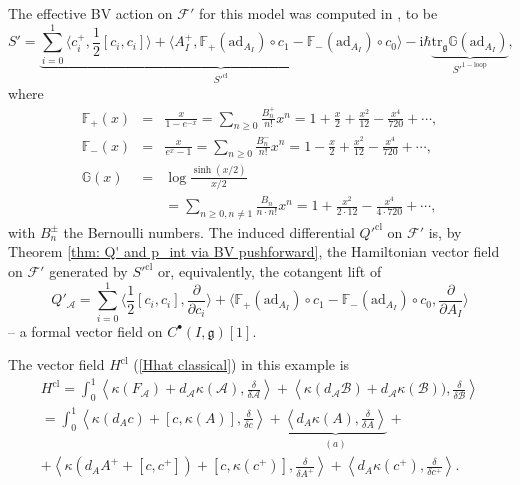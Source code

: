 \documentclass{amsart}
\theoremstyle{plain} %
\theoremstyle{definition}
\theoremstyle{remark}
\newcommand{\g}{\mathfrak{g}}
\newcommand{\mr}{\mathrm}
\newcommand{\bt}{\bullet}
\newcommand{\ad}{\mathrm{ad}}
\newcommand{\F}{\mathcal{F}}
\newcommand{\dd}{\partial}
\newcommand{\iii}{\mathrm{i}}
\newcommand{\cl}{\mathrm{cl}}
\newcommand{\A}{\mathcal{A}}
\newcommand{\B}{\mathcal{B}}
\begin{document}
The effective BV action on $\F'$ for this model was computed in \cite{simpBF}, \cite{discrBF} to be 
\begin{equation}
    S'=\underbrace{\sum_{i=0}^1\langle c^+_i,\frac12[c_i,c_i] \rangle
    +
    \langle A^+_I, \mathbb{F}_+(\ad_{A_I})\circ c_1 - \mathbb{F}_-(\ad_{A_I})\circ c_0 \rangle}_{S'^\cl} - \iii\hbar \underbrace{\mr{tr}_\g \mathbb{G}(\ad_{A_I})}_{S'^{\mr{1-loop}}},
\end{equation}
where
\begin{eqnarray}
    \mathbb{F}_+(x) &=&\frac{x}{1-e^{-x}}=\sum_{n\geq 0}\frac{B_n^+}{n!}x^n =1+\frac{x}{2}+\frac{x^2}{12}-\frac{x^4}{720}+\cdots,\\ 
    \mathbb{F}_-(x)&=&\frac{x}{e^x-1}=\sum_{n\geq 0}\frac{B_n^-}{n!}x^n=1-\frac{x}{2}+\frac{x^2}{12}-\frac{x^4}{720}+\cdots,\\ 
    \mathbb{G}(x)&=&\log \frac{\sinh (x/2)}{x/2} \label{G(x)}\\
    \nonumber &&=\sum_{n\geq 0,n\neq 1}\frac{B_n}{n\cdot n!}x^n=1+\frac{x^2}{2\cdot 12}-\frac{x^4}{4\cdot 720}+\cdots,
\end{eqnarray}
with $B_n^\pm$ the Bernoulli numbers. The induced differential $Q'^\cl$ on $\F'$ is, by Theorem \ref{thm: Q' and p_int via BV pushforward}, the Hamiltonian vector field on $\F'$ generated by $S'^\cl$ or, equivalently, the cotangent lift of 
\begin{equation}
Q'_\A= \sum_{i=0}^1\langle \frac12 [c_i,c_i],\frac{\dd}{\dd c_i} \rangle+
\langle \mathbb{F}_+(\ad_{A_I})\circ c_1-\mathbb{F}_-(\ad_{A_I})\circ c_0 , \frac{\dd}{\dd A_I}\rangle
\end{equation}
-- a formal vector field on $C^\bt(I,\g)[1]$.






The vector field $H^\cl$ (\ref{Hhat classical}) in this example is
\begin{multline}\label{1d BF Hhat classical}
    H^\cl= 
    \int_0^1 \left\langle \kappa (F_\A) +d_\A \kappa(\A),\frac{\delta}{\delta\A} \right\rangle + \left\langle \kappa(d_\A \B)+d_\A \kappa(\B)),\frac{\delta}{\delta \B} \right\rangle\\
    =
    \int_0^1
    \left\langle \kappa (d_A c) + [c,\kappa (A)],\frac{\delta}{\delta c} \right\rangle+
    \underbrace{\left\langle d_A \kappa(A),\frac{\delta}{\delta A}
    \right\rangle}_{(a)}+\\
    +
    \left\langle \kappa (d_A A^+ +[c,c^+])+[c,\kappa(c^+)],\frac{\delta}{\delta A^+} \right\rangle
    +\left\langle d_A \kappa (c^+),\frac{\delta}{\delta c^+} \right\rangle.
\end{multline}
\end{document}
